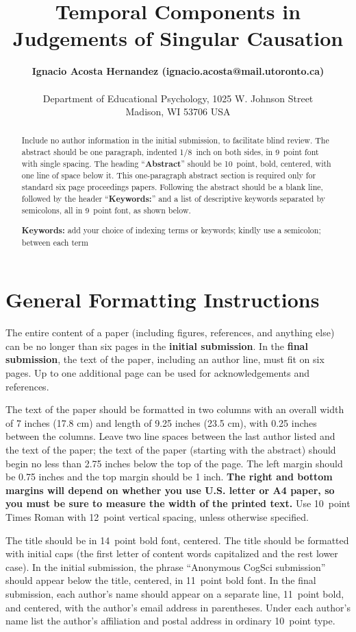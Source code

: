\documentclass[10pt,letterpaper]{article}
\title{Temporal Components in Judgements of Singular Causation}
\author{{\large \bf Ignacio Acosta Hernandez (ignacio.acosta@mail.utoronto.ca)} \\
  \AND {\large \bf Sharon J.~Derry (SDJ@Macc.Wisc.Edu)} \\
  Department of Educational Psychology, 1025 W. Johnson Street \\
  Madison, WI 53706 USA}
\begin{document}
\maketitle


\begin{abstract}
Include no author information in the initial submission, to facilitate
blind review.  The abstract should be one paragraph, indented 1/8~inch on both sides,
in 9~point font with single spacing. The heading ``{\bf Abstract}''
should be 10~point, bold, centered, with one line of space below
it. This one-paragraph abstract section is required only for standard
six page proceedings papers. Following the abstract should be a blank
line, followed by the header ``{\bf Keywords:}'' and a list of
descriptive keywords separated by semicolons, all in 9~point font, as
shown below.

\textbf{Keywords:} 
add your choice of indexing terms or keywords; kindly use a
semicolon; between each term
\end{abstract}


\section{General Formatting Instructions}

The entire content of a paper (including figures, references, and anything else) can be no longer than six pages in the \textbf{initial submission}. In the \textbf{final submission}, the text of the paper, including an author line, must fit on six pages. Up to one additional page can be used for acknowledgements and references.

The text of the paper should be formatted in two columns with an
overall width of 7 inches (17.8 cm) and length of 9.25 inches (23.5
cm), with 0.25 inches between the columns. Leave two line spaces
between the last author listed and the text of the paper; the text of
the paper (starting with the abstract) should begin no less than 2.75 inches below the top of the
page. The left margin should be 0.75 inches and the top margin should
be 1 inch.  \textbf{The right and bottom margins will depend on
  whether you use U.S. letter or A4 paper, so you must be sure to
  measure the width of the printed text.} Use 10~point Times Roman
with 12~point vertical spacing, unless otherwise specified.

The title should be in 14~point bold font, centered. The title should
be formatted with initial caps (the first letter of content words
capitalized and the rest lower case). In the initial submission, the
phrase ``Anonymous CogSci submission'' should appear below the title,
centered, in 11~point bold font.  In the final submission, each
author's name should appear on a separate line, 11~point bold, and
centered, with the author's email address in parentheses. Under each
author's name list the author's affiliation and postal address in
ordinary 10~point type.
\end{document}
